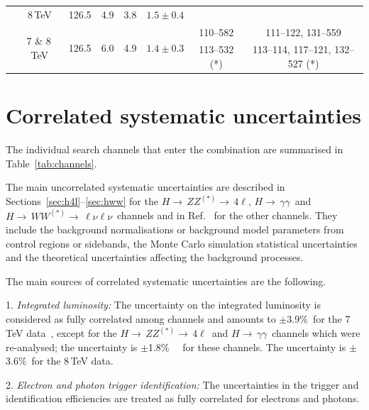 \documentclass[final,3p,times,twocolumn]{elsarticle}
\newcommand{\hgg}{\ensuremath{H{\rightarrow\,}\gamma\gamma}}
\newcommand{\hWWlnln}{\ensuremath{H{\rightarrow\,}WW^{(*)}{\rightarrow\,}\ell\nu\ell\nu}}
\newcommand{\hZZllll}{\ensuremath{H{\rightarrow\,}ZZ^{(*)}{\rightarrow\,}4\ell}}
\newcommand{\lowerExpNoGeV}{110}
\newcommand{\upperExpNoGeV}{582}
\newcommand{\lowerlowerObsNoGeV}{111}
\newcommand{\upperlowerObsNoGeV}{122}
\newcommand{\lowerObsNoGeV}{131}
\newcommand{\upperObsNoGeV}{559}
\begin{document}
\begin{table}[!htb]
{\begin{tabular}{cc|ccc|c|cc}
                                  & 8\,TeV      & 126.5  & 4.9 & 3.8 & $1.5\pm 0.4$&         &   \\ 
                                  & \multirow{2}{*}{7 \& 8\,TeV} & \multirow{2}{*}{126.5}  & \multirow{2}{*}{6.0} &\multirow{2}{*}{4.9} & \multirow{2}{*}{$1.4\pm 0.3$} & \lowerExpNoGeV--\upperExpNoGeV & \lowerlowerObsNoGeV--\upperlowerObsNoGeV, \lowerObsNoGeV--\upperObsNoGeV \\
                                  &                              &                         &                      & &                               &                   113--532 (*) & 113--114, 117--121, 132--527 (*) \\
      \hline\hline
    \end{tabular}} 
  \end{table}



\section{Correlated systematic uncertainties}
\label{sec:CombSyst}

The individual search channels that enter the combination are
summarised in Table~\ref{tab:channels}. 

The main uncorrelated systematic
uncertainties 
are described in
Sections~\ref{sec:h4l}--\ref{sec:hww} for the \hZZllll, \hgg\ and
\hWWlnln\ channels and in Ref.~\cite{paper2012prd} for the other
channels. They include the background normalisations or background
model parameters from control regions or sidebands, the Monte
Carlo simulation statistical uncertainties and the theoretical
uncertainties affecting the background processes.

The main sources of correlated systematic uncertainties are the
following.

1. {\it Integrated luminosity:} The uncertainty on the integrated
luminosity is considered as fully correlated among channels and
amounts to $\pm$3.9\%\ for the 7\,TeV data~\cite{Aad:2011dr,
LuminosityCONF}, except for the \hZZllll\ and \hgg\ channels which were
re-analysed; the uncertainty is $\pm$1.8\%\ ~\cite{ATLAS-CONF-2012-080} for these channels. 
The uncertainty is $\pm$3.6\%\ for the 8\,TeV data.

2. {\it Electron and photon trigger identification:} The uncertainties in the
trigger and identification efficiencies are treated as fully
correlated for electrons and photons.
\end{document}

